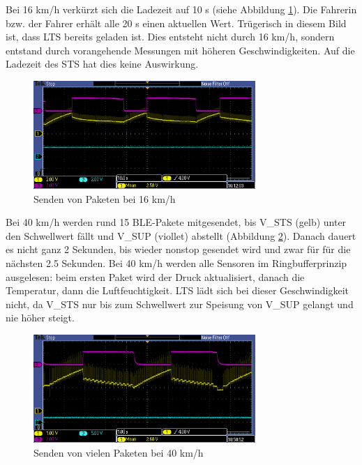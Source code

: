 Bei 16 km/h verkürzt sich die Ladezeit auf 10 s (siehe Abbildung \ref{paket_16kmh}). Die Fahrerin bzw. der Fahrer erhält alle 20 s einen aktuellen Wert. Trügerisch in diesem Bild ist, dass LTS bereits geladen ist. Dies entsteht nicht durch 16 km/h, sondern entstand durch vorangehende Messungen mit höheren Geschwindigkeiten. Auf die Ladezeit des STS hat dies keine Auswirkung.

\begin{figure}[ht]
   \includegraphics[width=0.75\textwidth]{4Resultate/imag/pic2.PNG}
    \caption{Senden von Paketen bei 16 km/h}
    \label{paket_16kmh}
\end{figure}

Bei 40 km/h werden rund 15 BLE-Pakete mitgesendet, bis V\_STS (gelb) unter den Schwellwert fällt und V\_SUP (viollet) abstellt (Abbildung \ref{paket_40kmh}). Danach dauert es nicht ganz 2 Sekunden, bis wieder nonstop gesendet wird und zwar für für die nächsten 2.5 Sekunden. Bei 40 km/h werden alle Sensoren im Ringbufferprinzip ausgelesen: beim ersten Paket wird der Druck aktualisiert, danach die Temperatur, dann die Luftfeuchtigkeit. LTS lädt sich bei dieser Geschwindigkeit nicht, da V\_STS nur bis zum Schwellwert zur Speisung von V\_SUP gelangt und nie höher steigt.

\begin{figure}[ht]
   \includegraphics[width=0.75\textwidth]{4Resultate/imag/pic4.PNG}
    \caption{Senden von vielen Paketen bei 40 km/h}
    \label{paket_40kmh}
\end{figure}


